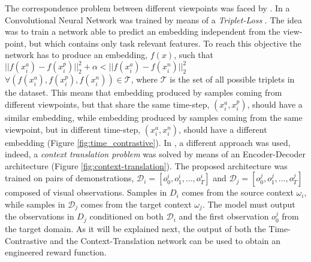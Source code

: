 \newline The correspondence problem between different viewpoints was faced by \cite{sermanet2018time_contrastive,liu2018imitation_from_observation}. In \cite{sermanet2018time_contrastive} a Convolutional Neural Network was trained by means of a \textit{Triplet-Loss} \cite{schroff2015triplet_loss}. The idea was to train a network able to predict an embedding independent from the view-point, but which contains only task relevant features. To reach this objective the network has to produce an embedding, $f(x)$, such that $|| f(x^{a}_{i}) - f(x^{p}_{i})||^{2}_{2} + \alpha < || f(x^{a}_{i}) - f(x^{n}_{i})||^{2}_{2}$ $\forall (f(x^{a}_{i}), f(x^{p}_{i}), f(x^{n}_{i})) \in \mathcal{T}$, where $\mathcal{T}$ is the set of all possible triplets in the dataset. This means that embedding produced by samples coming from different viewpoints, but that share the same time-step, $(x^{a}_{i},x^{p}_{i})$, should have a similar embedding, while embedding produced by samples coming from the same viewpoint, but in different time-step, $(x^{a}_{i},x^{n}_{i})$, should have a different embedding (Figure \ref{fig:time_contrastive}). In \cite{liu2018imitation_from_observation}, a different approach was used, indeed, a \textit{context translation problem} was solved by means of an Encoder-Decoder architecture (Figure \ref{fig:context-translation}). The proposed architecture was trained on pairs of demonstrations, $\mathcal{D}_{i}=[o^{i}_{0},o^{i}_{1},\dots,o^{i}_{T}]$ and $\mathcal{D}_{j}=[o^{j}_{0},o^{j}_{1},\dots,o^{j}_{T}]$ composed of visual observations. Samples in $D_{i}$ comes from the source context $\omega_{i}$, while samples in $\mathcal{D}_{j}$ comes from the target context $\omega_{j}$. The model must output the observations in $D_{j}$ conditioned on both $\mathcal{D}_{i}$ and the first observation $o^{j}_{0}$ from the target domain. As it will be explained next, the output of both the Time-Contrastive and the Context-Translation network can be used to obtain an engineered reward function.


